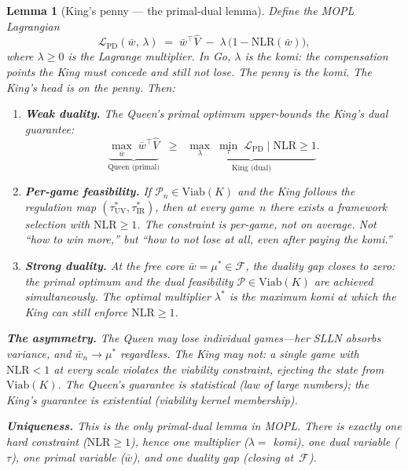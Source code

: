 \documentclass[11pt,a4paper]{article}
\newtheorem{lemma}[theorem]{Lemma}
\newcommand{\cL}{\mathcal{L}}
\newcommand{\cF}{\mathcal{F}}
\newcommand{\cP}{\mathcal{P}}
\begin{document}
\begin{lemma}[King's penny --- the primal-dual lemma]%
\label{lem:kings-penny}
\color{black!60}%
Define the \emph{MOPL Lagrangian}
\begin{equation}\label{eq:mopl-lagrangian}
  \cL_{\mathrm{PD}}(\bar{w},\, \lambda)
  \;=\;
  \bar{w}^\top \hat{V}
  \;-\;
  \lambda\,\bigl(1 - \mathrm{NLR}(\bar{w})\bigr),
\end{equation}
where $\lambda \geq 0$ is the Lagrange multiplier.
In Go, $\lambda$ is the \emph{komi}: the compensation points
the King must concede and still not lose.
The penny is the komi.
The King's head is on the penny.
Then:
\begin{enumerate}[label=\textup{(\roman*)}, nosep]
\item \textbf{Weak duality.}\;
  The Queen's primal optimum upper-bounds the King's
  dual guarantee:
  \[
    \underbrace{\max_{\bar{w}}\;
      \bar{w}^\top \hat{V}}_
      {\text{Queen (primal)}}
    \;\;\geq\;\;
    \underbrace{\max_\lambda\;
      \min_\tau\;
      \cL_{\mathrm{PD}}
        \;\big|\;
      \mathrm{NLR} \geq 1}_
      {\text{King (dual)}}.
  \]

\item \textbf{Per-game feasibility.}\;
  If\/ $\cP_n \in \mathrm{Viab}(K)$ and the King follows
  the regulation map
  $(\tau_{\mathrm{UV}}^*, \tau_{\mathrm{IR}}^*)$,
  then at every game~$n$ there exists a framework selection
  with $\mathrm{NLR} \geq 1$.
  The constraint is \emph{per-game, not on average}.
  Not ``how to win more,'' but
  ``how to not lose at all, even after paying the komi.''

\item \textbf{Strong duality.}\;
  At the free core $\bar{w} = \mu^* \in \cF$,
  the duality gap closes to zero:
  the primal optimum and the dual feasibility
  $\cP \in \mathrm{Viab}(K)$ are achieved simultaneously.
  The optimal multiplier $\lambda^*$ is the maximum komi
  at which the King can still enforce $\mathrm{NLR} \geq 1$.
\end{enumerate}

\medskip\noindent
\textbf{The asymmetry.}\;
The Queen may lose individual games---her SLLN absorbs
variance, and $\bar{w}_n \to \mu^*$ regardless.
The King may not: a single game with
$\mathrm{NLR} < 1$ at every scale violates the viability
constraint, ejecting the state from $\mathrm{Viab}(K)$.
The Queen's guarantee is \emph{statistical}
(law of large numbers);
the King's guarantee is \emph{existential}
(viability kernel membership).

\medskip\noindent
\textbf{Uniqueness.}\;
This is the \emph{only} primal-dual lemma in MOPL\@.
There is exactly one hard constraint ($\mathrm{NLR} \geq 1$),
hence one multiplier ($\lambda =$ komi),
one dual variable ($\tau$),
one primal variable ($\bar{w}$),
and one duality gap (closing at~$\cF$).
\end{lemma}
\end{document}
